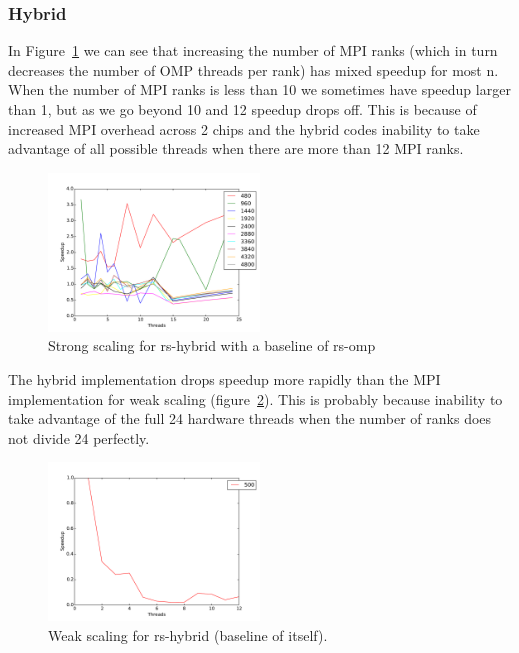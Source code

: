 \subsubsection{Hybrid}

In Figure~\ref{strong-rs-hybrid} we can see that increasing the number of MPI
ranks (which in turn decreases the number of OMP threads per rank) has mixed
speedup for most n. When the number of MPI ranks is less than 10 we sometimes
have speedup larger than 1, but as we go beyond 10 and 12 speedup drops off.
This is because of increased MPI overhead across 2 chips and the hybrid codes
inability to take advantage of all possible threads when there are more than 12
MPI ranks.

\begin{figure}[ht]
\centering
\includegraphics[width=0.5\textwidth]{plots/strong_rs-hybrid_baseline-rs-omp--1.pdf}
\caption{Strong scaling for rs-hybrid with a baseline of rs-omp}
\label{strong-rs-hybrid}
\end{figure}

The hybrid implementation drops speedup more rapidly than the MPI implementation
for weak scaling (figure~\ref{weak-rs-hybrid}). This is probably because
inability to take advantage of the full 24 hardware threads when the number of
ranks does not divide 24 perfectly.

\begin{figure}[ht]
\centering
\includegraphics[width=0.5\textwidth]{plots/weak_rs-hybrid.pdf}
\caption{Weak scaling for rs-hybrid (baseline of itself).}
\label{weak-rs-hybrid}
\end{figure}

